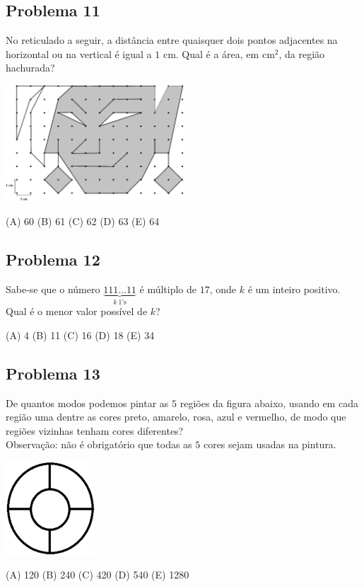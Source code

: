 \documentclass[12pt]{article}
\begin{document}
\subsection{Problema 11}
\begin{tcolorbox}[statementbox]
No reticulado a seguir, a distância entre quaisquer dois pontos adjacentes na horizontal ou na vertical é igual a $1$ cm. Qual é a área, em cm$^{2}$, da região hachurada?

  \begin{center}
  \includegraphics[width=0.5\textwidth]{third.png}
\end{center}


(A) 60 (B) 61 (C) 62 (D) 63 (E) 64
\end{tcolorbox}
\clearpage

\subsection{Problema 12}
\begin{tcolorbox}[statementbox]
Sabe-se que o número $\underbrace{111\ldots 11}_{k\ \text{1’s}}$ é múltiplo de $17$, onde $k$ é um inteiro positivo. Qual é o menor valor possível de $k$?

(A) 4 (B) 11 (C) 16 (D) 18 (E) 34
\end{tcolorbox}
\clearpage

\subsection{Problema 13}
\begin{tcolorbox}[statementbox]
De quantos modos podemos pintar as $5$ regiões da figura abaixo, usando em cada região uma dentre as cores preto, amarelo, rosa, azul e vermelho, de modo que regiões vizinhas tenham cores diferentes? \\
Observação: não é obrigatório que todas as $5$ cores sejam usadas na pintura.


  \begin{center}
  \includegraphics[width=0.25\textwidth]{fourth.png}
\end{center}


(A) 120 (B) 240 (C) 420 (D) 540 (E) 1280
\end{tcolorbox}
\clearpage
\end{document}
